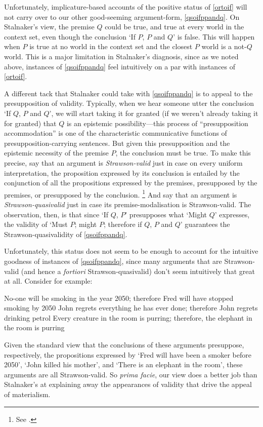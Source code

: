\documentclass[If.tex]{subfiles}
\begin{document}
Unfortunately, implicature-based accounts of the positive status of \ref{ortoif} will not carry over to our other good-seeming argument-form, \ref{qsoifppandq}.  On Stalnaker's view, the premise $Q$ could be true, and true at every world in the context set, even though the conclusion ‘If $P$, $P$ and $Q$’ is false.  This will happen when $P$ is true at no world in the context set and the closest $P$ world is a not-$Q$ world.  This is a major limitation in Stalnaker's diagnosis, since as we noted above, instances of \ref{qsoifppandq} feel intuitively on a par with instances of \ref{ortoif}.  

A different tack that Stalnaker could take with \ref{qsoifppandq} is to appeal to the presupposition of validity.  Typically, when we hear someone utter the conclusion ‘If $Q$, $P$ and $Q$’, we will start taking it for granted (if we weren't already taking it for granted) that $Q$ is an epistemic possibility---this process of “presupposition accommodation” is one of the characteristic communicative functions of presupposition-carrying sentences.  But given this presupposition and the epistemic necessity of the premise $P$, the conclusion must be true.  To make this precise, say that an argument is \emph{Strawson-valid} just in case on every uniform interpretation, the proposition expressed by its conclusion is entailed by the conjunction of all the propositions expressed by the premises, presupposed by the premises, or presupposed by the conclusion.%
\footnote{See \cite{vonFintelNLSECD}.}  
And say that an argument is \emph{Strawson-quasivalid} just in case its premise-modalisation is Strawson-valid.  The observation, then, is that since ‘If $Q$, $P$’ presupposes what ‘Might $Q$’ expresses, the validity of ‘Must $P$; might $P$; therefore if $Q$, $P$ and $Q$’ guarantees the Strawson-quasivalidity of \ref{qsoifppandq}.  

Unfortunately, this status does not seem to be enough to account for the intuitive goodness of instances of \ref{qsoifppandq}, since many arguments that are Strawson-valid (and hence a \emph{fortiori} Strawson-quasivalid) don't seem intuitively that great at all.  Consider for example:
\begin{prop}
	\nitem
	\begin{prop}
		\aitem 
		No-one will be smoking in the year 2050; therefore Fred will have stopped smoking by 2050
		\aitem 
		John regrets everything he has ever done; therefore John regrets drinking petrol
		\aitem 
		Every creature in the room is purring; therefore, the elephant in the room is purring
	\end{prop}
\end{prop}
Given the standard view that the conclusions of these arguments presuppose, respectively, the propositions expressed by ‘Fred will have been a smoker before 2050’, ‘John killed his mother’, and ‘There is an elephant in the room’, these arguments are all Strawson-valid.  So \emph{prima facie}, our view does a better job than Stalnaker's at explaining away the appearances of validity that drive the appeal of materialism.
\end{document}

